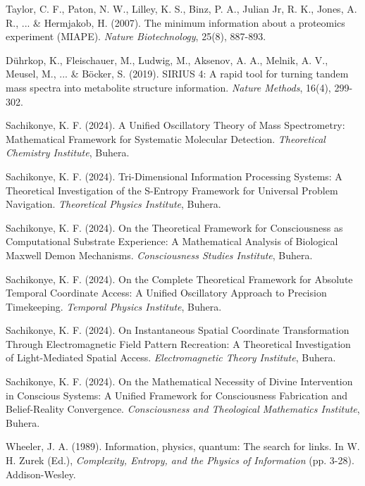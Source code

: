\documentclass[11pt,a4paper]{article}
\theoremstyle{remark}
\begin{document}
{{{{{{{{{{\begin{thebibliography}{99}
Taylor, C. F., Paton, N. W., Lilley, K. S., Binz, P. A., Julian Jr, R. K., Jones, A. R., ... \& Hermjakob, H. (2007). The minimum information about a proteomics experiment (MIAPE). \textit{Nature Biotechnology}, 25(8), 887-893.

Dührkop, K., Fleischauer, M., Ludwig, M., Aksenov, A. A., Melnik, A. V., Meusel, M., ... \& Böcker, S. (2019). SIRIUS 4: A rapid tool for turning tandem mass spectra into metabolite structure information. \textit{Nature Methods}, 16(4), 299-302.

Sachikonye, K. F. (2024). A Unified Oscillatory Theory of Mass Spectrometry: Mathematical Framework for Systematic Molecular Detection. \textit{Theoretical Chemistry Institute}, Buhera.

Sachikonye, K. F. (2024). Tri-Dimensional Information Processing Systems: A Theoretical Investigation of the S-Entropy Framework for Universal Problem Navigation. \textit{Theoretical Physics Institute}, Buhera.

Sachikonye, K. F. (2024). On the Theoretical Framework for Consciousness as Computational Substrate Experience: A Mathematical Analysis of Biological Maxwell Demon Mechanisms. \textit{Consciousness Studies Institute}, Buhera.

Sachikonye, K. F. (2024). On the Complete Theoretical Framework for Absolute Temporal Coordinate Access: A Unified Oscillatory Approach to Precision Timekeeping. \textit{Temporal Physics Institute}, Buhera.

Sachikonye, K. F. (2024). On Instantaneous Spatial Coordinate Transformation Through Electromagnetic Field Pattern Recreation: A Theoretical Investigation of Light-Mediated Spatial Access. \textit{Electromagnetic Theory Institute}, Buhera.

Sachikonye, K. F. (2024). On the Mathematical Necessity of Divine Intervention in Conscious Systems: A Unified Framework for Consciousness Fabrication and Belief-Reality Convergence. \textit{Consciousness and Theological Mathematics Institute}, Buhera.

Wheeler, J. A. (1989). Information, physics, quantum: The search for links. In W. H. Zurek (Ed.), \textit{Complexity, Entropy, and the Physics of Information} (pp. 3-28). Addison-Wesley.


\end{thebibliography}}}}}}}}}}}
\end{document}
